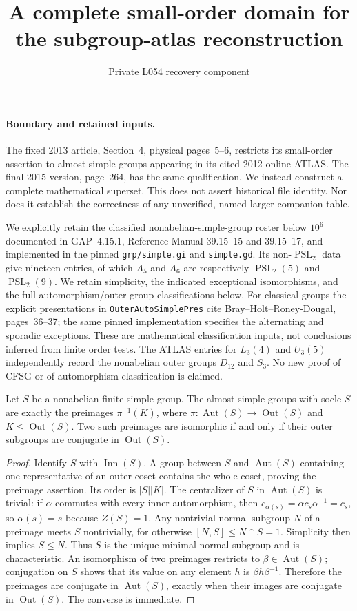\documentclass[11pt]{article}
\title{A complete small-order domain for the subgroup-atlas reconstruction}
\author{Private L054 recovery component}\date{}
\newcommand{\PSL}{\operatorname{PSL}}\newcommand{\Aut}{\operatorname{Aut}}
\newcommand{\Out}{\operatorname{Out}}
\begin{document}
\maketitle
\paragraph{Boundary and retained inputs.}
The fixed 2013 article, Section~4, physical pages~5--6, restricts its
small-order assertion to almost simple groups appearing in its cited
2012 online ATLAS. The final 2015 version, page~264, has the same
qualification. We instead construct a complete mathematical superset.
This does not assert historical file identity. Nor does it establish the
correctness of any unverified, named larger companion table.

We explicitly retain the classified nonabelian-simple-group roster below
$10^6$ documented in GAP~4.15.1, Reference Manual 39.15--15 and
39.15--17, and implemented in the pinned \texttt{grp/simple.gi} and
\texttt{simple.gd}. Its non-$\PSL_2$ data give nineteen entries, of which
$A_5$ and $A_6$ are respectively $\PSL_2(5)$ and $\PSL_2(9)$.
We retain simplicity, the indicated exceptional isomorphisms, and the full
automorphism/outer-group classifications below. For classical groups the
explicit presentations in \texttt{OuterAutoSimplePres} cite
Bray--Holt--Roney-Dougal, pages~36--37; the same pinned implementation
specifies the alternating and sporadic exceptions. These are mathematical
classification inputs, not conclusions inferred from finite order tests.
The ATLAS entries for $L_3(4)$ and $U_3(5)$ independently record the
nonabelian outer groups $D_{12}$ and $S_3$. No new proof of CFSG or of
automorphism classification is claimed.

\begin{lemma}
Let $S$ be a nonabelian finite simple group. The almost simple groups with
socle $S$ are exactly the preimages $\pi^{-1}(K)$, where
$\pi:\Aut(S)\to\Out(S)$ and $K\leq\Out(S)$.
Two such preimages are isomorphic if and only if their outer subgroups
are conjugate in $\Out(S)$.
\end{lemma}
\begin{proof}
Identify $S$ with $\operatorname{Inn}(S)$. A group between $S$ and
$\Aut(S)$ containing one representative of an outer coset contains the
whole coset, proving the preimage assertion. Its order is $|S||K|$.
The centralizer of $S$ in $\Aut(S)$ is trivial: if $\alpha$ commutes
with every inner automorphism, then
$c_{\alpha(s)}=\alpha c_s\alpha^{-1}=c_s$, so $\alpha(s)=s$ because
$Z(S)=1$. Any nontrivial normal subgroup $N$ of a preimage meets $S$
nontrivially, for otherwise $[N,S]\leq N\cap S=1$. Simplicity then
implies $S\leq N$. Thus $S$ is the unique minimal normal subgroup
and is characteristic. An isomorphism of two preimages restricts to
$\beta\in\Aut(S)$; conjugation on $S$ shows that its value on any
element $h$ is $\beta h\beta^{-1}$. Therefore the preimages are
conjugate in $\Aut(S)$, exactly when their images are conjugate in
$\Out(S)$. The converse is immediate.
\end{proof}
\end{document}
